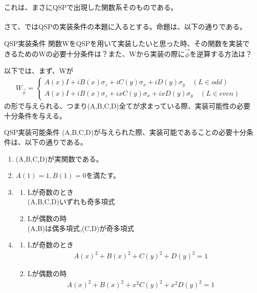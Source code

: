 \documentclass[a4paper,10.5pt]{article}
\numberwithin{equation}{section}
\begin{document}
これは、まさにQSPで出現した関数系そのものである。\\
\\
さて、ではQSPの実装条件の本題に入るとする。命題は、以下の通りである。
\begin{problembox}{QSP実装条件}
    関数WをQSPを用いて実装したいと思った時、その関数を実装できるためのWの必要十分条件は？また、Wから実装の際に$\vec{\phi}$を逆算する方法は？
\end{problembox}
以下では、まず、Wが
\begin{align*}
        W_{\vec{\phi}}=
        \begin{cases}
            A(x)I+iB(x)\sigma_{z}+iC(y)\sigma_{x}+iD(y)\sigma_{y}\quad(L\in odd)\\
            A(x)I+iB(x)\sigma_{z}+ixC(y)\sigma_{x}+ixD(y)\sigma_{y}\quad (L\in even)
        \end{cases}
\end{align*}
の形で与えられる、つまり(A,B,C,D)全てが求まっている際、実装可能性の必要十分条件を与える。
\begin{resultbox}{QSP実装可能条件}
    (A,B,C,D)が与えられた際、実装可能であることの必要十分条件は、以下の通りである。
    \begin{enumerate}
        \item (A,B,C,D)が実関数である。
        \item $A(1)=1,B(1)=0$を満たす。
        \item \begin{enumerate}
            \item Lが奇数のとき\\
            (A,B,C,D)いずれも奇多項式
            \item Lが偶数の時\\
            (A,B)は偶多項式,(C,D)が奇多項式
        \end{enumerate}
        \item\begin{enumerate}
            \item Lが奇数のとき
            \begin{align*}
                A(x)^{2}+B(x)^{2}+C(y)^{2}+D(y)^{2}=1
            \end{align*}
            \item Lが偶数の時
            \begin{align*}
                A(x)^{2}+B(x)^{2}+x^{2}C(y)^{2}+x^{2}D(y)^{2}=1
            \end{align*}
        \end{enumerate}
    \end{enumerate}
\end{resultbox}
\end{document}
